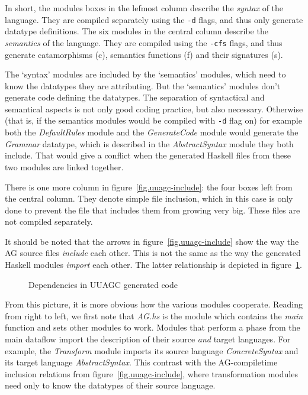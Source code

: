 \documentclass[twoside]{article}
\newcommand{\simplepicture}[2]{\centerline{\mbox{\texttt{[image: figs/\#2]}}}}
\begin{document}
In short, the modules boxes in the lefmost column describe the {\em syntax}
of the language. 
They are compiled separately using the \verb"-d" flags, and thus only generate datatype definitions.
The six modules in the central column describe the {\em semantics}
of the language. 
They are compiled using the \verb"-cfs" flags, and thus generate catamorphisms (c),
semantics functions (f) and their signatures (s).

The `syntax' modules are included by the `semantics' modules, which need to know
the datatypes they are attributing.
But the `semantics' modules don't generate code defining the datatypes.
The separation of syntactical and semantical aspects is not only 
good coding practice, but also necessary.
Otherwise (that is, if the semantics modules would be compiled with \verb"-d" flag on)
for example both the {\em DefaultRules} module and the {\em GenerateCode} module would generate
the {\em Grammar} datatype, which is described in the {\em AbstractSyntax} module they both include.
That would give a conflict when the generated Haskell files from these two modules are linked together.

There is one more column in figure~\ref{fig.uuagc-include}: the four boxes left from the central column.
They denote simple file inclusion, which in this case is only done to prevent the file that includes
them from growing very big. These files are not compiled separately.

It should be noted that the arrows in figure~\ref{fig.uuagc-include}
show the way the AG source files {\em include} each other.
This is not the same as the way the generated Haskell modules {\em import} each other.
The latter relationship is depicted in figure~\ref{fig.uuagc-import}.
\begin{figure}[htbp]
\raisebox{0mm}{\simplepicture{0.5}{uuagc-import}}
\caption{Dependencies in UUAGC generated code}
\label{fig.uuagc-import}
\end{figure}

From this picture, it is more obvious how the various modules cooperate.
Reading from right to left, we first note that {\em AG.hs} is the module
which contains the {\em main} function and sets other modules to work.
Modules that perform a phase from the main dataflow import
the description of their source {\em and} target languages.
For example, the {\em Transform} module imports
its source language {\em ConcreteSyntax} and its target language {\em AbstractSyntax}.
This contrast with the AG-compiletime inclusion relations from figure~\ref{fig.uuagc-include},
where transformation modules need only to know the datatypes of their source language.
\end{document}
